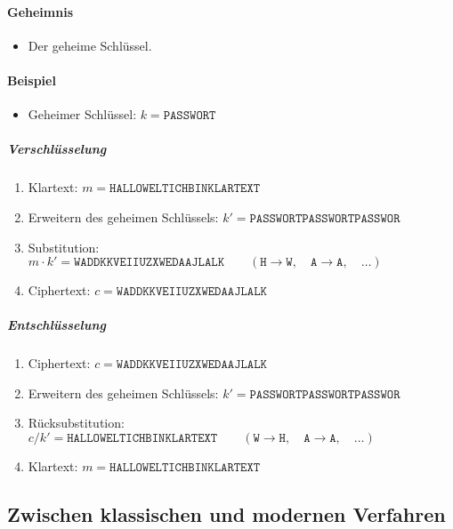 				\paragraph{Geheimnis}
					\begin{itemize}
						\item Der geheime Schlüssel.
					\end{itemize}

				\paragraph{Beispiel}
					\begin{itemize}
						\item Geheimer Schlüssel: \( k = \texttt{PASSWORT} \)
					\end{itemize}

					\subparagraph{Verschlüsselung}
						\begin{enumerate}
							\item[] Klartext: \( m = \texttt{HALLOWELTICHBINKLARTEXT} \)
							\item Erweitern des geheimen Schlüssels: \( k' = \texttt{PASSWORTPASSWORTPASSWOR} \)
							\item Substitution: \( m \cdot k' = \texttt{WADDKKVEIIUZXWEDAAJLALK} \qquad(\texttt{H} \rightarrow \texttt{W}, \quad\texttt{A} \rightarrow \texttt{A}, \quad\dots) \)
							\item[] Ciphertext: \( c = \texttt{WADDKKVEIIUZXWEDAAJLALK} \)
						\end{enumerate}

					\subparagraph{Entschlüsselung}
						\begin{enumerate}
							\item[] Ciphertext: \( c = \texttt{WADDKKVEIIUZXWEDAAJLALK} \)
							\item Erweitern des geheimen Schlüssels: \( k' = \texttt{PASSWORTPASSWORTPASSWOR} \)
							\item Rücksubstitution: \( c / k' = \texttt{HALLOWELTICHBINKLARTEXT} \qquad(\texttt{W} \rightarrow \texttt{H}, \quad\texttt{A} \rightarrow \texttt{A}, \quad\dots) \)
							\item[] Klartext: \( m = \texttt{HALLOWELTICHBINKLARTEXT} \)
						\end{enumerate}

		\subsection{Zwischen klassischen und modernen Verfahren}
